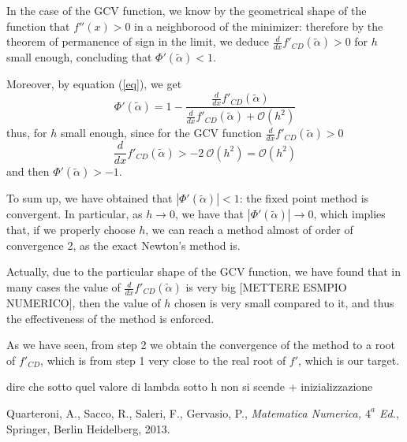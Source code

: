 \documentclass[a4paper,11 pt]{report}
\theoremstyle{plain}
\theoremstyle{definition}
\theoremstyle{remark}
\begin{document}
In the case of the GCV function, we know by the geometrical shape of the function that $f''(x)>0$ in a neighborood of the minimizer: therefore by the theorem of permanence of sign in the limit, we deduce $\frac{d}{dx}f'_{CD}(\tilde{\alpha})>0$ for $h$ small enough, concluding that $\Phi'(\tilde{\alpha})<1$.

Moreover, by equation (\ref{eq}), we get 
\begin{equation}
\Phi'(\tilde{\alpha})=1-\dfrac{\frac{d}{dx}f'_{CD}(\tilde{\alpha})}{\frac{d}{dx}f'_{CD}(\tilde{\alpha})+\mathcal{O}(h^2)}
\end{equation}
thus, for $h$ small enough, since for the GCV function $\frac{d}{dx}f'_{CD}(\tilde{\alpha})>0$
\begin{equation*}
\frac{d}{dx}f'_{CD}(\tilde{\alpha})>-2\ \mathcal{O}(h^2)=\mathcal{O}(h^2)
\end{equation*}
and then $\Phi'(\tilde{\alpha})>-1$. 
 

To sum up, we have obtained that $|\Phi'(\tilde{\alpha})|<1$: the fixed point method is convergent.
In particular, as $h\rightarrow0$, we have that $|\Phi'(\tilde{\alpha})|\rightarrow0$, which implies that, if we properly choose $h$, we can reach a method almost of order of convergence 2, as the exact Newton's method is. 

Actually, due to the particular shape of the GCV function, we have found that in many cases the value of $\frac{d}{dx}f'_{CD}(\tilde{\alpha})$ is very big [METTERE ESMPIO NUMERICO], then the value of $h$ chosen is very small compared to it, and thus the effectiveness of the method is enforced.

As we have seen, from step 2 we obtain the convergence of the method to a root of $f'_{CD}$, which is from step 1 very close to the real root of $f'$, which is our target. 

dire che sotto quel valore di lambda sotto h non si scende + inizializzazione

\begin{thebibliography}{9}
	
	
	 Quarteroni, A., Sacco, R., Saleri, F., Gervasio, P., \textit{Matematica Numerica, $4^a$ Ed.}, Springer, Berlin Heidelberg, 2013.
	

\end{thebibliography} 	
\end{document}
